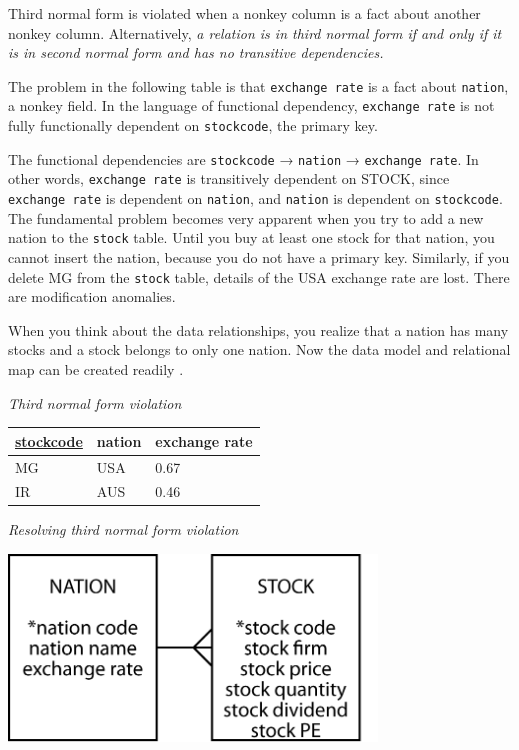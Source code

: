 \documentclass[
]{article}
\begin{document}
Third normal form is violated when a nonkey column is a fact about
another nonkey column. Alternatively, \emph{a relation is in third normal
form if and only if it is in second normal form and has no transitive
dependencies.}

The problem in the following table is that \texttt{exchange\ rate} is a fact
about \texttt{nation}, a nonkey field. In the language of functional
dependency, \texttt{exchange\ rate} is not fully functionally dependent on
\texttt{stockcode}, the primary key.

The functional dependencies are \texttt{stockcode} → \texttt{nation} →
\texttt{exchange\ rate}. In other words, \texttt{exchange\ rate} is transitively
dependent on STOCK, since \texttt{exchange\ rate} is dependent on \texttt{nation}, and
\texttt{nation} is dependent on \texttt{stockcode}. The fundamental problem becomes
very apparent when you try to add a new nation to the \texttt{stock} table.
Until you buy at least one stock for that nation, you cannot insert the
nation, because you do not have a primary key. Similarly, if you delete
MG from the \texttt{stock} table, details of the USA exchange rate are lost.
There are modification anomalies.

When you think about the data relationships, you realize that a nation
has many stocks and a stock belongs to only one nation. Now the data
model and relational map can be created readily .

\emph{Third normal form violation}

\begin{longtable}[]{@{}lll@{}}
\toprule
\underline{stockcode} & nation & exchange rate \\
\midrule
\endhead
MG & USA & 0.67 \\
IR & AUS & 0.46 \\
\bottomrule
\end{longtable}

\emph{Resolving third normal form violation}

\includegraphics[width=3.85417in,height=\textheight]{Figures/Chapter 4/nation-stock.png}
\end{document}
